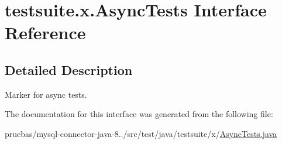 \hypertarget{interfacetestsuite_1_1x_1_1_async_tests}{}\section{testsuite.\+x.\+Async\+Tests Interface Reference}
\label{interfacetestsuite_1_1x_1_1_async_tests}


\subsection{Detailed Description}
Marker for async tests. 

The documentation for this interface was generated from the following file\+:\begin{DoxyCompactItemize}
\item 
pruebas/mysql-\/connector-\/java-\/8../src/test/java/testsuite/x/\mbox{\hyperlink{_async_tests_8java}{Async\+Tests.\+java}}\end{DoxyCompactItemize}
